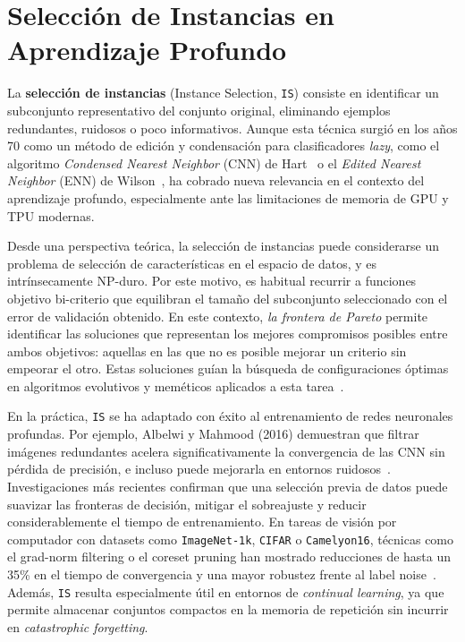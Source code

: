 \section{Selección de Instancias en Aprendizaje Profundo}
La \textbf{selección de instancias} (Instance Selection, \texttt{IS}) consiste en identificar un subconjunto representativo del conjunto original,
eliminando ejemplos redundantes, ruidosos o poco informativos.
Aunque esta técnica surgió en los años 70 como un método de edición y condensación para clasificadores \textit{lazy},
como el algoritmo \textit{Condensed Nearest Neighbor} (CNN) de Hart~\cite{hartCondensedNearestNeighbor1968} o
el \textit{Edited Nearest Neighbor} (ENN) de Wilson~\cite{wilsonAsymptoticPropertiesNearest1972},
ha cobrado nueva relevancia en el contexto del aprendizaje profundo, especialmente ante las limitaciones de memoria de GPU y TPU modernas.

Desde una perspectiva teórica, la selección de instancias puede considerarse un problema de selección de características en el espacio de datos, y es intrínsecamente NP-duro.
Por este motivo, es habitual recurrir a funciones objetivo bi-criterio que equilibran el tamaño del subconjunto seleccionado con el error de validación obtenido.
En este contexto, \textit{la frontera de Pareto} permite identificar las soluciones que representan los mejores compromisos posibles entre ambos objetivos:
aquellas en las que no es posible mejorar un criterio sin empeorar el otro.
Estas soluciones guían la búsqueda de configuraciones óptimas en algoritmos evolutivos y meméticos aplicados a esta tarea~\cite{derracSurveyEvolutionaryInstance2012}.

En la práctica, \texttt{IS} se ha adaptado con éxito al entrenamiento de redes neuronales profundas.
Por ejemplo, Albelwi y Mahmood (2016) demuestran que filtrar imágenes redundantes acelera significativamente la convergencia de las CNN sin pérdida de precisión,
e incluso puede mejorarla en entornos ruidosos~\cite{albelwiFrameworkDesigningArchitectures2017}.
Investigaciones más recientes confirman que una selección previa de datos puede suavizar las fronteras de decisión,
mitigar el sobreajuste y reducir considerablemente el tiempo de entrenamiento.
En tareas de visión por computador con datasets como \texttt{ImageNet-1k}, \texttt{CIFAR} o \texttt{Camelyon16},
técnicas como el grad-norm filtering o el coreset pruning han mostrado reducciones de hasta un 35\% en el tiempo de convergencia y una mayor robustez frente al label noise~\cite{salman2023data, rolnickDeepLearningRobust2018}.
Además, \texttt{IS} resulta especialmente útil en entornos de \textit{continual learning},
ya que permite almacenar conjuntos compactos en la memoria de repetición sin incurrir en \textit{catastrophic forgetting}.


